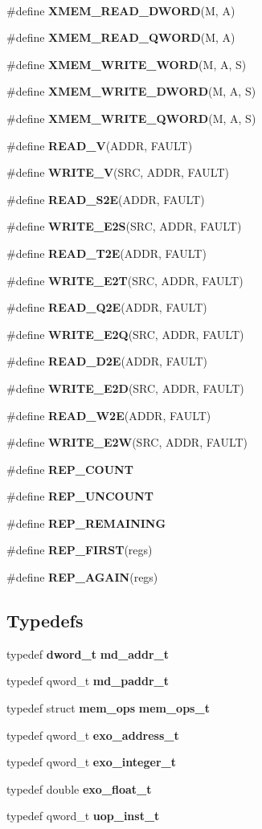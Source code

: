 \begin{CompactItemize}
$$\item 
\#define {\bf XMEM\_\-READ\_\-DWORD}(M, A)
\item 
\#define {\bf XMEM\_\-READ\_\-QWORD}(M, A)
\item 
\#define {\bf XMEM\_\-WRITE\_\-WORD}(M, A, S)
\item 
\#define {\bf XMEM\_\-WRITE\_\-DWORD}(M, A, S)
\item 
\#define {\bf XMEM\_\-WRITE\_\-QWORD}(M, A, S)
\item 
\#define {\bf READ\_\-V}(ADDR, FAULT)
\item 
\#define {\bf WRITE\_\-V}(SRC, ADDR, FAULT)
\item 
\#define {\bf READ\_\-S2E}(ADDR, FAULT)
\item 
\#define {\bf WRITE\_\-E2S}(SRC, ADDR, FAULT)
\item 
\#define {\bf READ\_\-T2E}(ADDR, FAULT)
\item 
\#define {\bf WRITE\_\-E2T}(SRC, ADDR, FAULT)
\item 
\#define {\bf READ\_\-Q2E}(ADDR, FAULT)
\item 
\#define {\bf WRITE\_\-E2Q}(SRC, ADDR, FAULT)
\item 
\#define {\bf READ\_\-D2E}(ADDR, FAULT)
\item 
\#define {\bf WRITE\_\-E2D}(SRC, ADDR, FAULT)
\item 
\#define {\bf READ\_\-W2E}(ADDR, FAULT)
\item 
\#define {\bf WRITE\_\-E2W}(SRC, ADDR, FAULT)
\item 
\#define {\bf REP\_\-COUNT}
\item 
\#define {\bf REP\_\-UNCOUNT}
\item 
\#define {\bf REP\_\-REMAINING}
\item 
\#define {\bf REP\_\-FIRST}(regs)
\item 
\#define {\bf REP\_\-AGAIN}(regs)
\end{CompactItemize}
\subsection*{Typedefs}
\begin{CompactItemize}
\item 
typedef {\bf dword\_\-t} {\bf md\_\-addr\_\-t}
\item 
typedef qword\_\-t {\bf md\_\-paddr\_\-t}
\item 
typedef struct {\bf mem\_\-ops} {\bf mem\_\-ops\_\-t}
\item 
typedef qword\_\-t {\bf exo\_\-address\_\-t}
\item 
typedef qword\_\-t {\bf exo\_\-integer\_\-t}
\item 
typedef double {\bf exo\_\-float\_\-t}
\item 
typedef qword\_\-t {\bf uop\_\-inst\_\-t}
\end{CompactItemize}
